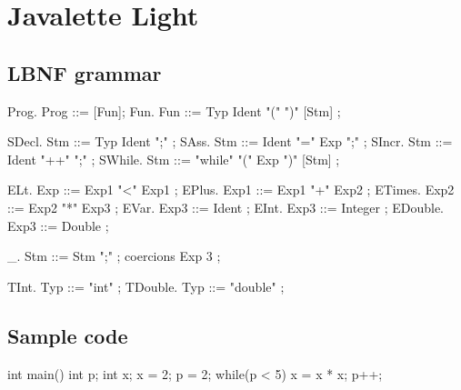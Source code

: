 \documentclass[a4paper,12pt,twosided]{report}
\begin{document}
%
%




%
%

\appendix
\chapter{Javalette Light}

\section{LBNF grammar}
\begin{code}
Prog.     Prog     ::= [Fun];
Fun.      Fun      ::= Typ Ident "(" ")"  [Stm] ;

SDecl.    Stm      ::= Typ Ident ";"  ;
SAss.     Stm      ::= Ident "=" Exp ";"  ;
SIncr.    Stm      ::= Ident "++" ";"  ;
SWhile.   Stm      ::= "while" "(" Exp ")" [Stm]  ;

ELt.      Exp      ::= Exp1 "<" Exp1 ;
EPlus.    Exp1     ::= Exp1 "+" Exp2 ;
ETimes.   Exp2     ::= Exp2 "*" Exp3 ;
EVar.     Exp3     ::= Ident ;
EInt.     Exp3     ::= Integer ;
EDouble.  Exp3     ::= Double ;

_.        Stm      ::= Stm ";" ;
coercions Exp 3 ;

TInt.     Typ  ::= "int" ;
TDouble.  Typ  ::= "double" ;
\end{code}

\newpage
\section{Sample code}
\begin{code}
int main() {
    int p;
    int x;
    x = 2;
    p = 2;
    while(p < 5) {
        x = x * x;
        p++;
    }
}
\end{code}
\end{document}
